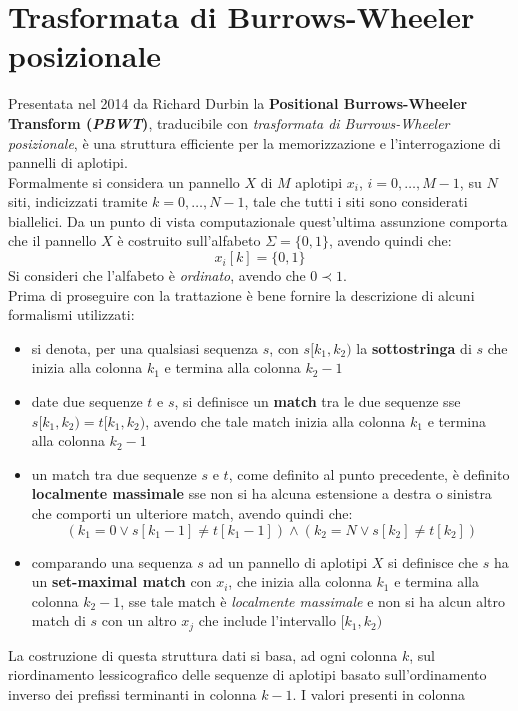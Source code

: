 \section{Trasformata di Burrows-Wheeler posizionale}
Presentata nel 2014 da Richard Durbin la \textbf{Positional Burrows-Wheeler
  Transform (\textit{PBWT})}, traducibile con \textit{trasformata di
  Burrows-Wheeler posizionale}, è una struttura efficiente per la memorizzazione
e l'interrogazione di pannelli di aplotipi.\\
Formalmente si considera un pannello $X$ di $M$ aplotipi $x_i$, $i=0,\ldots,
M-1$, su $N$ siti, indicizzati tramite $k=0,\ldots, N-1$, tale che tutti i siti
sono considerati biallelici. Da un punto di vista computazionale quest'ultima
assunzione comporta che il pannello $X$ è costruito sull'alfabeto $\Sigma
=\{0,1\}$, avendo quindi che:
\[x_i[k]=\{0,1\}\]
Si consideri che l'alfabeto è \textit{ordinato}, avendo che $0\prec 1$.\\
Prima di proseguire con la trattazione è bene fornire la descrizione di alcuni
formalismi utilizzati:
\begin{itemize}
  \item si denota, per una qualsiasi sequenza $s$, con $s[k_1,k_2)$ la
  \textbf{sottostringa} di $s$ che inizia alla colonna $k_1$ e termina alla colonna
  $k_2-1$
  \item date due sequenze $t$ e $s$, si definisce un \textbf{match} tra le due
  sequenze sse $s[k_1,k_2)=t[k_1,k_2)$, avendo che tale match inizia alla
  colonna $k_1$ e termina alla colonna $k_2-1$
  \item un match tra due sequenze $s$ e $t$, come definito al punto precedente,
  è definito \textbf{localmente massimale} sse non si ha alcuna estensione a
  destra o sinistra che comporti un ulteriore match, avendo quindi che:
  \[(k_1=0\lor s[k_1-1]\neq t[k_1-1])\land (k_2=N\lor s[k_2]\neq t[k_2] )\]
  \item comparando una sequenza $s$ ad un pannello di aplotipi $X$ si definisce
  che $s$ ha un \textbf{set-maximal match} con $x_i$, che inizia alla
  colonna $k_1$ e termina alla colonna $k_2-1$, sse tale match è
  \textit{localmente massimale} e non si ha alcun altro match di $s$ con un
  altro $x_j$ che include l'intervallo $[k_1,k_2)$
\end{itemize}
La costruzione di questa struttura dati si basa, ad ogni colonna $k$, sul
riordinamento lessicografico delle sequenze di aplotipi basato sull'ordinamento
inverso dei prefissi terminanti in colonna $k-1$. I valori presenti in colonna
